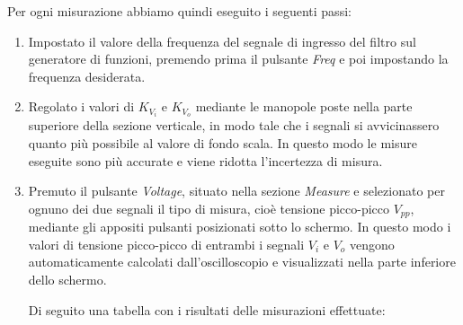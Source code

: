 Per ogni misurazione abbiamo quindi eseguito i seguenti passi:
\begin{enumerate}
    \item Impostato il valore della frequenza del segnale di ingresso del filtro  sul generatore di funzioni, premendo prima il pulsante \emph{Freq} e poi impostando la frequenza desiderata.
    \item Regolato i valori di $K_{V_i}$ e $K_{V_o}$ mediante le manopole poste nella parte superiore della sezione verticale, in modo tale che i segnali si avvicinassero quanto più possibile al valore di fondo scala. In questo modo le misure eseguite sono più accurate e viene ridotta l'incertezza di misura.
    \item Premuto il pulsante \emph{Voltage}, situato nella sezione \emph{Measure} e selezionato per ognuno dei due segnali il tipo di misura, cioè tensione picco-picco $V_{pp}$, mediante gli appositi pulsanti posizionati sotto lo schermo.
    In questo modo i valori di tensione picco-picco di entrambi i segnali $V_i$ e $V_o$ vengono automaticamente calcolati dall'oscilloscopio e visualizzati nella parte inferiore dello schermo.

Di seguito una tabella con i risultati delle misurazioni effettuate:
    
\end{enumerate}
